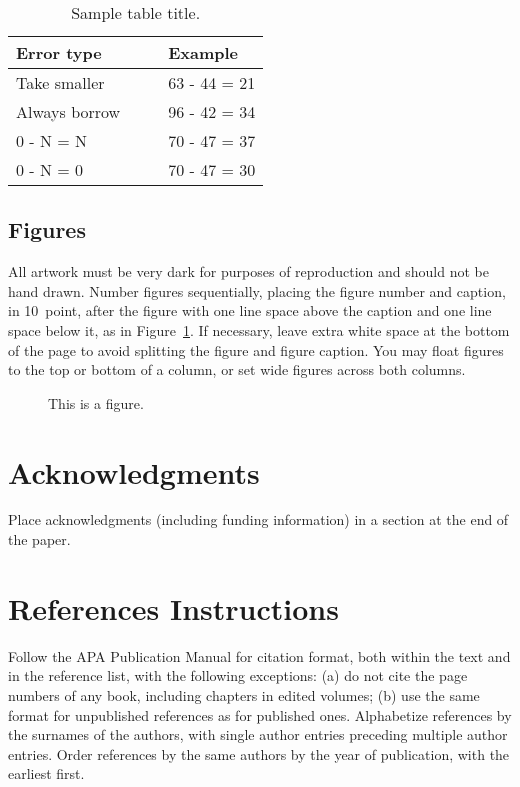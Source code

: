 \documentclass[10pt,letterpaper]{article}
\begin{document}
\begin{table}[!ht]
\begin{center} 
\caption{Sample table title.} 
\label{sample-table} 
\vskip 0.12in
\begin{tabular}{ll} 
\hline
Error type    &  Example \\
\hline
Take smaller        &   63 - 44 = 21 \\
Always borrow~~~~   &   96 - 42 = 34 \\
0 - N = N           &   70 - 47 = 37 \\
0 - N = 0           &   70 - 47 = 30 \\
\hline
\end{tabular} 
\end{center} 
\end{table}


\subsection{Figures}

All artwork must be very dark for purposes of reproduction and should
not be hand drawn. Number figures sequentially, placing the figure
number and caption, in 10~point, after the figure with one line space
above the caption and one line space below it, as in
Figure~\ref{sample-figure}. If necessary, leave extra white space at
the bottom of the page to avoid splitting the figure and figure
caption. You may float figures to the top or bottom of a column, or
set wide figures across both columns.

\begin{figure}[ht]
\begin{center}
\end{center}
\caption{This is a figure.} 
\label{sample-figure}
\end{figure}


\section{Acknowledgments}

Place acknowledgments (including funding information) in a section at
the end of the paper.


\section{References Instructions}

Follow the APA Publication Manual for citation format, both within the
text and in the reference list, with the following exceptions: (a) do
not cite the page numbers of any book, including chapters in edited
volumes; (b) use the same format for unpublished references as for
published ones. Alphabetize references by the surnames of the authors,
with single author entries preceding multiple author entries. Order
references by the same authors by the year of publication, with the
earliest first.
\end{document}
